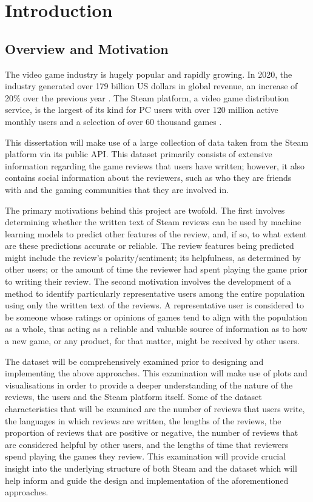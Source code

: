 \chapter{Introduction} \label{sec:Intro}

\section{Overview and Motivation} \label{sec:Intro_Overview}

The video game industry is hugely popular and rapidly growing. In 2020, the industry generated over 179 billion US dollars in global revenue, an increase of 20\% over the previous year \cite{GamingIndustrySize}. The Steam platform, a video game distribution service, is the largest of its kind for PC users \cite{SteamLargestDistributor} with over 120 million active monthly users \cite{SteamMonthlyUsers} and a selection of over 60 thousand games \cite{SteamGameCount}.

This dissertation will make use of a large collection of data taken from the Steam platform via its public API. This dataset primarily consists of extensive information regarding the game reviews that users have written; however, it also contains social information about the reviewers, such as who they are friends with and the gaming communities that they are involved in.

The primary motivations behind this project are twofold. The first involves determining whether the written text of Steam reviews can be used by machine learning models to predict other features of the review, and, if so, to what extent are these predictions accurate or reliable. The review features being predicted might include the review's polarity/sentiment; its helpfulness, as determined by other users; or the amount of time the reviewer had spent playing the game prior to writing their review. The second motivation involves the development of a method to identify particularly representative users among the entire population using only the written text of the reviews. A representative user is considered to be someone whose ratings or opinions of games tend to align with the population as a whole, thus acting as a reliable and valuable source of information as to how a new game, or any product, for that matter, might be received by other users.

The dataset will be comprehensively examined prior to designing and implementing the above approaches. This examination will make use of plots and visualisations in order to provide a deeper understanding of the nature of the reviews, the users and the Steam platform itself. Some of the dataset characteristics that will be examined are the number of reviews that users write, the languages in which reviews are written, the lengths of the reviews, the proportion of reviews that are positive or negative, the number of reviews that are considered helpful by other users, and the lengths of time that reviewers spend playing the games they review. This examination will provide crucial insight into the underlying structure of both Steam and the dataset which will help inform and guide the design and implementation of the aforementioned approaches.


